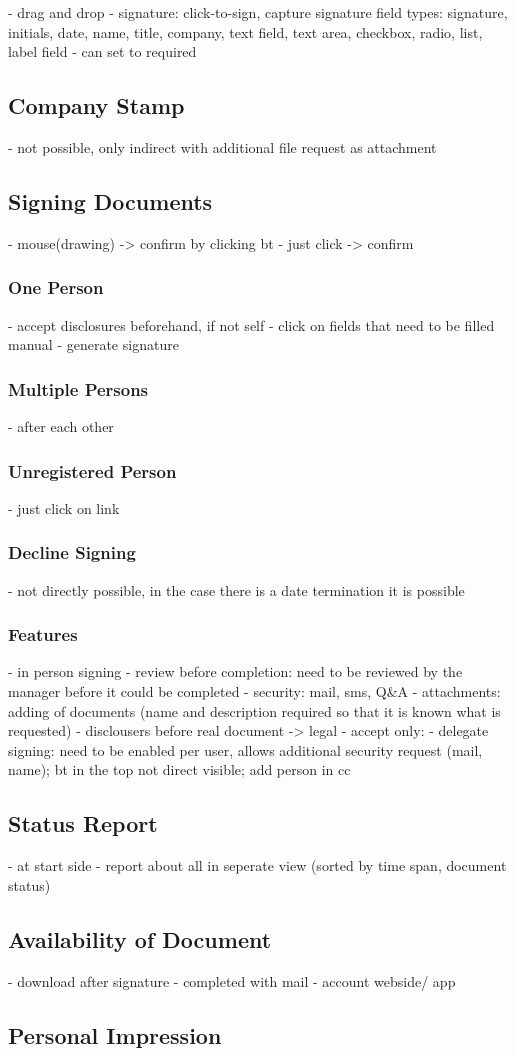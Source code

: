- drag and drop 
- signature: click-to-sign, capture signature
field types: signature, initials, date, name, title, company, text field, text area, checkbox, radio, list, label field
- can set to required

\subsection{Company Stamp}
- not possible, only indirect with additional file request as attachment

\subsection{Signing Documents}
- mouse(drawing) -> confirm by clicking bt
- just click -> confirm

\subsubsection{One Person}
- accept disclosures beforehand, if not self
- click on fields that need to be filled manual
- generate signature

\subsubsection{Multiple Persons}
- after each other

\subsubsection{Unregistered Person}
- just click on link

\subsubsection{Decline Signing}
- not directly possible, in the case there is a date termination it is possible

\subsubsection{Features}
- in person signing
- review before completion: need to be reviewed by the manager before it could be completed
- security: mail, sms, Q\&A
- attachments: adding of documents (name and description required so that it is known what is requested)
- disclousers before real document -> legal
- accept only: 
- delegate signing: need to be enabled per user, allows additional security request (mail, name); bt in the top not direct visible; add person in cc
\subsection{Status Report}
- at start side
- report about all in seperate view (sorted by time span, document status)

\subsection{Availability of Document}
- download after signature
- completed with mail
- account webside/ app

\subsection{Personal Impression}